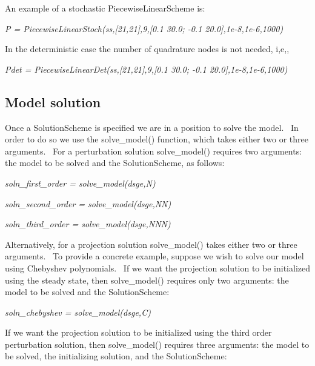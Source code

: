 \documentclass[notitlepage,11pt]{article}
\begin{document}
\bigskip

An example of a stochastic PiecewiseLinearScheme is:

\bigskip

\textit{P = PiecewiseLinearStoch(ss,[21,21],9,[0.1 30.0; -0.1
20.0],1e-8,1e-6,1000)}

\bigskip

In the deterministic case the number of quadrature nodes is not needed, i,e,,

\bigskip

\textit{Pdet = PiecewiseLinearDet(ss,[21,21],9,[0.1 30.0; -0.1
20.0],1e-8,1e-6,1000)}

\subsection{Model solution}

Once a SolutionScheme is specified we are in a position to solve the model.
\ In order to do so we use the solve\_model() function, which takes either
two or three arguments. \ For a perturbation solution solve\_model()
requires two arguments: the model to be solved and the SolutionScheme, as
follows:

\bigskip

\textit{soln\_first\_order = solve\_model(dsge,N)}

\bigskip

\textit{soln\_second\_order = solve\_model(dsge,NN)}

\bigskip

\textit{soln\_third\_order = solve\_model(dsge,NNN)}

\bigskip

Alternatively, for a projection solution solve\_model() takes either two or
three arguments. \ To provide a concrete example, suppose we wish to solve
our model using Chebyshev polynomials. \ If we want the projection solution
to be initialized using the steady state, then solve\_model() requires only
two arguments: the model to be solved and the SolutionScheme:

\bigskip

\textit{soln\_chebyshev = solve\_model(dsge,C)}

\bigskip

If we want the projection solution to be initialized using the third order
perturbation solution, then solve\_model() requires three arguments: the
model to be solved, the initializing solution, and the SolutionScheme:

\bigskip
\end{document}
